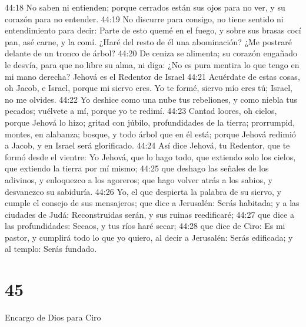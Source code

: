 44:18 No saben ni entienden; porque cerrados están sus ojos para no ver, y su corazón para no entender.  
44:19 No discurre para consigo, no tiene sentido ni entendimiento para decir: Parte de esto quemé en el fuego, y sobre sus brasas cocí pan, asé carne, y la comí. ¿Haré del resto de él una abominación? ¿Me postraré delante de un tronco de árbol?  
44:20 De ceniza se alimenta; su corazón engañado le desvía, para que no libre su alma, ni diga: ¿No es pura mentira lo que tengo en mi mano derecha?  
Jehová es el Redentor de Israel  
44:21 Acuérdate de estas cosas, oh Jacob, e Israel, porque mi siervo eres. Yo te formé, siervo mío eres tú; Israel, no me olvides.  
44:22 Yo deshice como una nube tus rebeliones, y como niebla tus pecados; vuélvete a mí, porque yo te redimí.  
44:23 Cantad loores, oh cielos, porque Jehová lo hizo; gritad con júbilo, profundidades de la tierra; prorrumpid, montes, en alabanza; bosque, y todo árbol que en él está; porque Jehová redimió a Jacob, y en Israel será glorificado.  
44:24 Así dice Jehová, tu Redentor, que te formó desde el vientre: Yo Jehová, que lo hago todo, que extiendo solo los cielos, que extiendo la tierra por mí mismo;  
44:25 que deshago las señales de los adivinos, y enloquezco a los agoreros; que hago volver atrás a los sabios, y desvanezco su sabiduría. 
44:26 Yo, el que despierta la palabra de su siervo, y cumple el consejo de sus mensajeros; que dice a Jerusalén: Serás habitada; y a las ciudades de Judá: Reconstruidas serán, y sus ruinas reedificaré;  
44:27 que dice a las profundidades: Secaos, y tus ríos haré secar;  
44:28 que dice de Ciro: Es mi pastor, y cumplirá todo lo que yo quiero, al decir a Jerusalén: Serás edificada; y al templo: Serás fundado.  

\chapter{45}

Encargo de Dios para Ciro  

